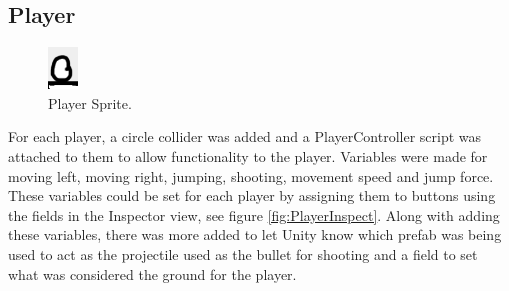 \subsection{Player}
\begin{figure}[h]
\centering
  \includegraphics[width= 0.3\linewidth]{Images/Player.PNG}
  \caption{Player Sprite.}
  \label{fig:Player}
\end{figure}
For each player, a circle collider was added and a PlayerController script was attached to them to allow functionality to the player. Variables were made for moving left, moving right, jumping, shooting, movement speed and jump force. These variables could be set for each player by assigning them to buttons using the fields in the Inspector view, see figure \ref{fig:PlayerInspect}. Along with adding these variables, there was more added to let Unity know which prefab was being used to act as the projectile used as the bullet for shooting and a field to set what was considered the ground for the player.

